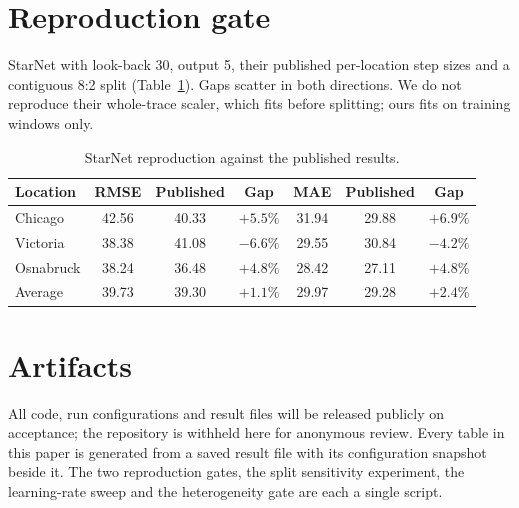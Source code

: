 \documentclass[acmsmall,screen]{acmart}
\begin{document}



\appendix

\section{Reproduction gate}
\label{app:gate}

StarNet with look-back 30, output 5, their published per-location step sizes and a contiguous 8:2 split (Table~\ref{tab:gatestarnet}). Gaps scatter in both directions. We do not reproduce their whole-trace scaler, which fits before splitting; ours fits on training windows only.

\begin{table}[h]
\caption{StarNet reproduction against the published results.}
\label{tab:gatestarnet}
\begin{tabular}{lcccccc}
\toprule
Location & RMSE & Published & Gap & MAE & Published & Gap \\
\midrule
Chicago & 42.56 & 40.33 & $+5.5\%$ & 31.94 & 29.88 & $+6.9\%$ \\
Victoria & 38.38 & 41.08 & $-6.6\%$ & 29.55 & 30.84 & $-4.2\%$ \\
Osnabruck & 38.24 & 36.48 & $+4.8\%$ & 28.42 & 27.11 & $+4.8\%$ \\
\midrule
Average & 39.73 & 39.30 & $+1.1\%$ & 29.97 & 29.28 & $+2.4\%$ \\
\bottomrule
\end{tabular}
\end{table}

\section{Artifacts}
\label{app:artifacts}

All code, run configurations and result files will be released publicly on acceptance; the repository is withheld here for anonymous review. Every table in this paper is generated from a saved result file with its configuration snapshot beside it. The two reproduction gates, the split sensitivity experiment, the learning-rate sweep and the heterogeneity gate are each a single script.
\end{document}
